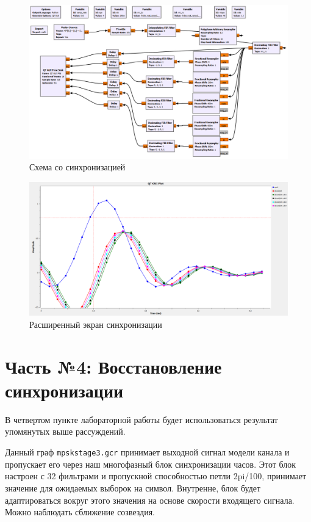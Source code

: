 \documentclass[a4paper]{article}
\begin{document}
            \begin{figure}[H]
                \centering
                \includegraphics[width=\textwidth]{ex_3_7.png}
                \caption{Схема со синхронизацией}
                \label{fig:ex_3_7}
            \end{figure}
            
            \begin{figure}[H]
                \centering
                \includegraphics[width=\textwidth]{ex_3_8.png}
                \caption{Расширенный экран синхронизации}
                \label{fig:ex_3_8}
            \end{figure}
            
    \newpage
        \section{Часть №4: Восстановление синхронизации}
            В четвертом пункте лабораторной работы будет использоваться результат упомянутых выше рассуждений.
            
            Данный граф \texttt{mpskstage3.gcr} принимает выходной сигнал модели канала и пропускает его через наш многофазный блок синхронизации часов. Этот блок настроен с 32 фильтрами и пропускной способностью петли 2pi/100, принимает значение для ожидаемых выборок на символ. Внутренне, блок будет адаптироваться вокруг этого значения на основе скорости входящего сигнала. Можно наблюдать сближение созвездия.
            
\end{document}
